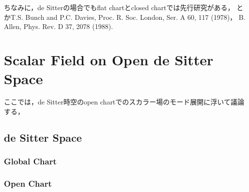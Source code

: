 ちなみに，de Sitterの場合でもflat chartとclosed chartでは先行研究がある， \cite{13}とかT.S.
Bunch and P.C. Davies, Proc. R. Soc. London, Ser. A 60, 117 (1978)， B. Allen, Phys. Rev. D 37, 2078 (1988).


\section{Scalar Field on Open de Sitter Space}
ここでは，de Sitter時空のopen chartでのスカラー場のモード展開に浮いて議論する，
\subsection{de Sitter Space}
\subsubsection{Global Chart}
\subsubsection{Open Chart}
